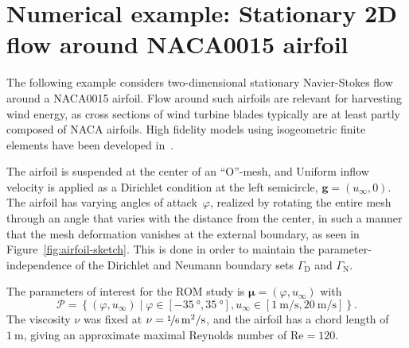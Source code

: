 \documentclass[a4paper]{jpconf}
\begin{document}
\section{Numerical example: Stationary 2D flow around NACA0015 airfoil}
\label{sec:airfoil}

The following example considers two-dimensional stationary
Navier-Stokes flow around a NACA0015 airfoil.  Flow around such
airfoils are relevant for harvesting wind energy, as cross sections of
wind turbine blades typically are at least partly composed of NACA
airfoils.  High fidelity models using isogeometric finite elements
have been developed in~\cite{Nordanger2015sap,Nordanger2015ict}.

The airfoil is suspended at the center of an ``O''-mesh, and Uniform
inflow velocity is applied as a Dirichlet condition at the left
semicircle, $\bm g = (u_\infty, 0)$.  The airfoil has varying angles
of attack~$\varphi$, realized by rotating the entire mesh through an
angle that varies with the distance from the center, in such a manner
that the mesh deformation vanishes at the external boundary, as seen
in Figure~\ref{fig:airfoil-sketch}.  This is done in order to maintain
the parameter-independence of the Dirichlet and Neumann boundary sets
$\Gamma_\text{D}$ and $\Gamma_\text{N}$.

The parameters of interest for the ROM study is
$\bm \mu = (\varphi, u_\infty)$ with
\[
  \mathcal{P} = \left\{ (\varphi,u_\infty) \;|\;
    \varphi \in [-\SI{35}{\degree},\SI{35}{\degree}],
    u_\infty \in [\SI{1}{\meter/\second}, \SI{20}{\meter/\second}]
  \right\}.
\]
The viscosity $\nu$ was fixed at
$\nu = \SI[parse-numbers=false]{\nicefrac{1}{6}}{\meter^2/\second}$,
and the airfoil has a chord length of $\SI{1}{\meter}$, giving an
approximate maximal Reynolds number of $\text{Re} = 120$.
\end{document}
